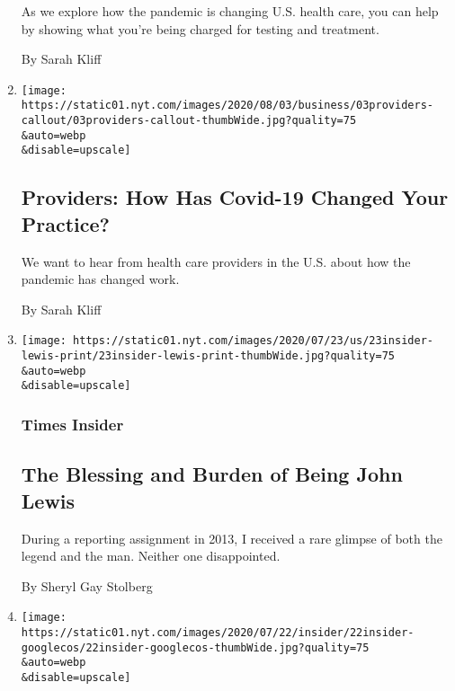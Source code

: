 \begin{enumerate}
  As we explore how the pandemic is changing U.S. health care, you can
  help by showing what you're being charged for testing and treatment.

  By Sarah Kliff
\item
  \href{/2020/08/03/reader-center/healthcare-workers-coronavirus-care.html}{}

  \texttt{[image: https://static01.nyt.com/images/2020/08/03/business/03providers-callout/03providers-callout-thumbWide.jpg?quality=75\\\&auto=webp\\\&disable=upscale]}

  \hypertarget{providers-how-has-covid-19-changed-your-practice}{%
  \subsection{Providers: How Has Covid-19 Changed Your
  Practice?}\label{providers-how-has-covid-19-changed-your-practice}}

  We want to hear from health care providers in the U.S. about how the
  pandemic has changed work.

  By Sarah Kliff
\item
  \href{/2020/07/23/insider/john-lewis-memory.html}{}

  \texttt{[image: https://static01.nyt.com/images/2020/07/23/us/23insider-lewis-print/23insider-lewis-print-thumbWide.jpg?quality=75\\\&auto=webp\\\&disable=upscale]}

  \hypertarget{times-insider-4}{%
  \subsubsection{Times Insider}\label{times-insider-4}}

  \hypertarget{the-blessing-and-burden-of-being-john-lewis}{%
  \subsection{The Blessing and Burden of Being John
  Lewis}\label{the-blessing-and-burden-of-being-john-lewis}}

  During a reporting assignment in 2013, I received a rare glimpse of
  both the legend and the man. Neither one disappointed.

  By Sheryl Gay Stolberg
\item
  \href{/2020/07/21/insider/new-york-times-google-docs.html}{}

  \texttt{[image: https://static01.nyt.com/images/2020/07/22/insider/22insider-googlecos/22insider-googlecos-thumbWide.jpg?quality=75\\\&auto=webp\\\&disable=upscale]}


\end{enumerate}
